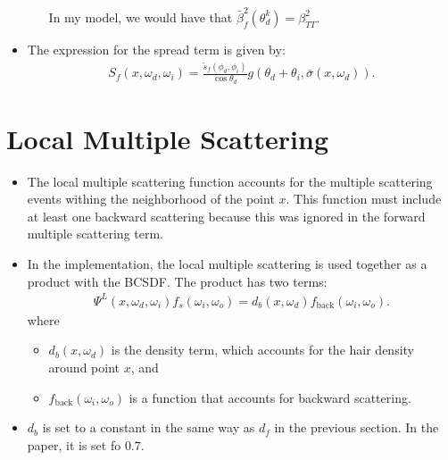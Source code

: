 \documentclass[10pt]{article}
\begin{document}
\begin{itemize}
\begin{itemize}
      In my model, we would have that $\bar{\beta}_f^2(\theta_d^k) = \beta^2_{TT}$.      
    \end{itemize}

    \item The expression for the spread term is given by:
    \begin{align*}
      S_f(x, \omega_d, \omega_i) = \frac{\tilde{s}_f(\phi_d, \phi_i)}{\cos \theta_d} g(\theta_d + \theta_i, \bar{\sigma}(x, \omega_d)).
    \end{align*}
  \end{itemize}

  \section{Local Multiple Scattering}
  \begin{itemize}
    \item The local multiple scattering function accounts for the multiple scattering events withing the neighborhood of the point $x$.  This function must include at least one backward scattering because this was ignored in the forward multiple scattering term.    

    \item In the implementation, the local multiple scattering is used together as a product with the BCSDF.  The product has two terms:
    \begin{align*}
      \Psi^L(x, \omega_d, \omega_i) f_s(\omega_i, \omega_o) = d_b(x, \omega_d) f_{\mathrm{back}}(\omega_i, \omega_o).
    \end{align*}
    where
    \begin{itemize}
      \item $d_b(x, \omega_d)$ is the density term, which accounts for the hair density around point $x$, and
      \item $f_{\mathrm{back}}(\omega_i, \omega_o)$ is a function that accounts for backward scattering.
    \end{itemize}

    \item $d_b$ is set to a constant in the same way as $d_f$ in the previous section.  In the paper, it is set fo $0.7$.


\end{itemize}
\end{document}
